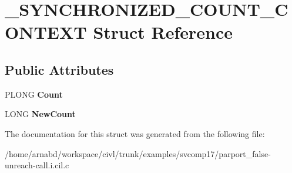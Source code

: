 \hypertarget{struct__SYNCHRONIZED__COUNT__CONTEXT}{}\section{\+\_\+\+S\+Y\+N\+C\+H\+R\+O\+N\+I\+Z\+E\+D\+\_\+\+C\+O\+U\+N\+T\+\_\+\+C\+O\+N\+T\+E\+X\+T Struct Reference}
\label{struct__SYNCHRONIZED__COUNT__CONTEXT}
\subsection*{Public Attributes}
\begin{DoxyCompactItemize}
\item 
\hypertarget{struct__SYNCHRONIZED__COUNT__CONTEXT_aa7e248bc9e0eb35a3bf9536b55251318}{}P\+L\+O\+N\+G {\bfseries Count}\label{struct__SYNCHRONIZED__COUNT__CONTEXT_aa7e248bc9e0eb35a3bf9536b55251318}

\item 
\hypertarget{struct__SYNCHRONIZED__COUNT__CONTEXT_a7a59d1dd504bffe54097246f671ca957}{}L\+O\+N\+G {\bfseries New\+Count}\label{struct__SYNCHRONIZED__COUNT__CONTEXT_a7a59d1dd504bffe54097246f671ca957}

\end{DoxyCompactItemize}


The documentation for this struct was generated from the following file\+:\begin{DoxyCompactItemize}
\item 
/home/arnabd/workspace/civl/trunk/examples/svcomp17/parport\+\_\+false-\/unreach-\/call.\+i.\+cil.\+c\end{DoxyCompactItemize}
